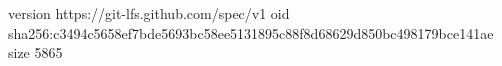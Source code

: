 version https://git-lfs.github.com/spec/v1
oid sha256:c3494c5658ef7bde5693bc58ee5131895c88f8d68629d850bc498179bce141ae
size 5865
